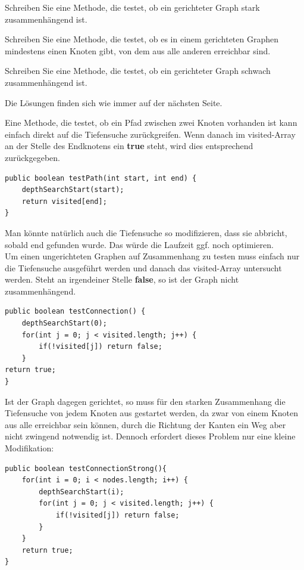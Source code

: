 \documentclass{article}
\begin{document}
\begin{task}{3}
Schreiben Sie eine Methode, die testet, ob ein gerichteter Graph stark zusammenhängend ist. 
\end{task}

\begin{task}{4}
Schreiben Sie eine Methode, die testet, ob es in einem gerichteten Graphen mindestens einen Knoten gibt, von dem aus alle anderen erreichbar sind.
\end{task}

\begin{task}{5}
Schreiben Sie eine Methode, die testet, ob ein gerichteter Graph schwach zusammenhängend ist. 
\end{task}

Die Lösungen finden sich wie immer auf der nächsten Seite.

\newpage 

Eine Methode, die testet, ob ein Pfad zwischen zwei Knoten vorhanden ist kann einfach direkt auf die Tiefensuche zurückgreifen. Wenn danach im visited-Array an der Stelle des Endknotens ein \textbf{true} steht, wird dies entsprechend zurückgegeben. \\
\begin{verbatim}
public boolean testPath(int start, int end) {
    depthSearchStart(start);
    return visited[end];
}
\end{verbatim}
Man könnte natürlich auch die Tiefensuche so modifizieren, dass sie abbricht, sobald end gefunden wurde. Das würde die Laufzeit ggf. noch optimieren. \\
Um einen ungerichteten Graphen auf Zusammenhang zu testen muss einfach nur die Tiefensuche ausgeführt werden und danach das visited-Array untersucht werden. Steht an irgendeiner Stelle \textbf{false}, so ist der Graph nicht zusammenhängend.
\begin{verbatim}
public boolean testConnection() {
    depthSearchStart(0);
    for(int j = 0; j < visited.length; j++) {
        if(!visited[j]) return false;
    }
return true;
} 
\end{verbatim}

Ist der Graph dagegen gerichtet, so muss für den starken Zusammenhang die Tiefensuche von jedem Knoten aus gestartet werden, da zwar von einem Knoten aus alle erreichbar sein können, durch die Richtung der Kanten ein  Weg aber nicht zwingend notwendig ist. Dennoch erfordert dieses Problem nur eine kleine Modifikation:
\begin{verbatim}
public boolean testConnectionStrong(){
    for(int i = 0; i < nodes.length; i++) {
        depthSearchStart(i);
        for(int j = 0; j < visited.length; j++) {
            if(!visited[j]) return false;
        }
    }
    return true;
}    
\end{verbatim}
\end{document}
